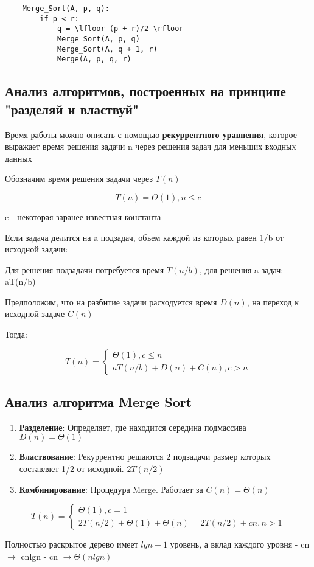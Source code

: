 \documentclass[a4paper, 12pt]{article}
\begin{document}
\begin{lstlisting}
    Merge_Sort(A, p, q):
        if p < r:
            q = \lfloor (p + r)/2 \rfloor
            Merge_Sort(A, p, q)
            Merge_Sort(A, q + 1, r)
            Merge(A, p, q, r)
\end{lstlisting}

\subsection{Анализ алгоритмов, построенных на принципе "разделяй и властвуй"}

Время работы можно описать с помощью \textbf{рекуррентного уравнения},
которое выражает время решения задачи n через решения задач для меньших входных данных

Обозначим время решения задачи через $T(n)$

$$
    T(n) = \Theta(1), n \leq c
$$

c - некоторая заранее известная константа

Если задача делится на a подзадач, объем каждой из которых равен 1/b от исходной задачи:

Для решения подзадачи потребуется время $T(n/b)$, для решения a задач: aT(n/b)

Предположим, что на разбитие задачи расходуется время $D(n)$, на переход к исходной задаче $C(n)$

Тогда:

$$
    T(n) = \begin{cases}
        \Theta(1), c \leq n \\
        aT(n/b) + D(n) + C(n), c > n
    \end{cases}
$$

\subsection{Анализ алгоритма Merge Sort}

\begin{enumerate}
    \item \textbf{Разделение}: Определяет, где находится середина подмассива $D(n) = \Theta(1)$
    \item \textbf{Властвование}: Рекуррентно решаются 2 подзадачи размер которых составляет 1/2 от исходной. $2T(n/2)$
    \item \textbf{Комбинирование}: Процедура Merge. Работает за $C(n) = \Theta(n)$
\end{enumerate}

$$
    T(n) = \begin{cases}
        \Theta(1), c = 1 \\
        2T(n / 2) + \Theta(1) + \Theta(n) = 2T(n / 2) + cn, n > 1
    \end{cases}
$$

Полностью раскрытое дерево имеет $lgn + 1$ уровень, а вклад каждого уровня - cn $\rightarrow$ cnlgn - cn $\rightarrow \Theta(nlgn)$
\end{document}
